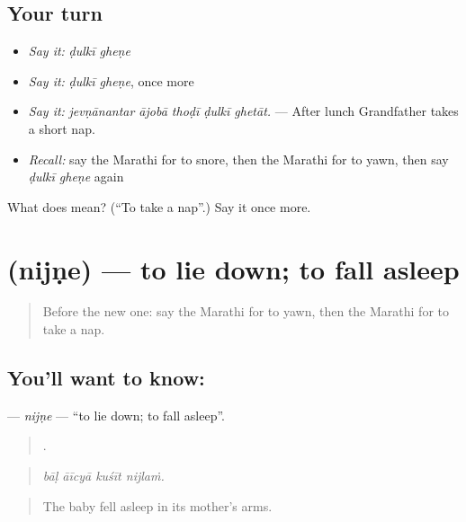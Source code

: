 \subsection*{Your turn}
\begin{itemize}
\raggedright
  \item \emph{Say it:} \emph{ḍulkī gheṇe}
  \item \emph{Say it:} \emph{ḍulkī gheṇe}, once more
  \item \emph{Say it:} \emph{jevṇānantar ājobā thoḍī ḍulkī ghetāt.} — After lunch Grandfather takes a short nap.
  \item \emph{Recall:} say the Marathi for to snore, then the Marathi for to yawn, then say \emph{ḍulkī gheṇe} again
\end{itemize}

\begin{tcolorbox}[breakable,colback=teal!4,colframe=teal!35!black,title={Before you move on}]
What does   mean? (\textquotedblleft{}To take a nap\textquotedblright{}.) Say it once more.
\end{tcolorbox}
\section[\texorpdfstring{\mr{निजणे} (nijṇe)}{निजणे (nijṇe)}]{ (nijṇe) — to lie down; to fall asleep}

\label{lesson:MR-C491-nijne}



\begin{quote}
Before the new one: say the Marathi for to yawn, then the Marathi for to take a nap.
\end{quote}

\subsection*{You'll want to know: }
\textbf{} — \emph{nijṇe} — \textquotedblleft{}to lie down; to fall asleep\textquotedblright{}.

\begin{quote}
   .
\end{quote}

\begin{quote}
\emph{bāḷ āīcyā kuśīt nijlaṁ.}
\end{quote}

\begin{quote}
The baby fell asleep in its mother's arms.
\end{quote}

